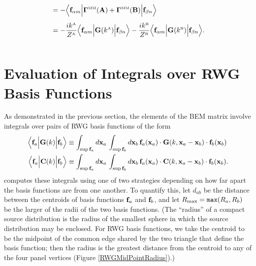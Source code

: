 \documentclass[dvips,letterpaper]{article}
\begin{document}
\begin{enumerate}
\begin{align*}
 &= -\Big\langle \mathbf{f}_{\alpha m} 
    \Big| \boldsymbol{\Gamma}^{\hbox{\tiny{MM}}}(\mathbf{A}) + \boldsymbol{\Gamma}^{\hbox{\tiny{MM}}}(\mathbf{B}) \Big|
                \mathbf{f}_{\beta n} 
    \Big\rangle
\\[5pt]
 &= -\frac{ik^{\hbox{\tiny{A}}}}{Z^{\hbox{\tiny{A}}}}
    \Big\langle \mathbf{f}_{\alpha m} 
                 \Big| \mathbf{G}(k^{\hbox{\tiny{A}}}) \Big|
                 \mathbf{f}_{\beta n} 
    \Big\rangle
    -
    \frac{ik^{\hbox{\tiny{B}}}}{Z^{\hbox{\tiny{B}}}}
    \Big\langle \mathbf{f}_{\alpha m} 
                 \Big| \mathbf{G}(k^{\hbox{\tiny{B}}}) \Big|
                 \mathbf{f}_{\beta n}
    \Big\rangle.
\\[10pt]
\end{align*}
\end{enumerate}

\newpage
\section{Evaluation of Integrals over RWG Basis Functions}

As demonstrated in the previous section, the elements of the 
BEM matrix involve integrals over pairs of RWG basis functions 
of the form
\begin{subequations}
\begin{align}
 \Big\langle \mathbf{f}_a \Big| \mathbf{G}(k) \Big | \mathbf{f}_b \Big \rangle
&\equiv 
  \int_{\sup \mathbf{f}_a} d\mathbf{x}_a \, 
  \int_{\sup \mathbf{f}_b} d\mathbf{x}_b\,
  \mathbf{f}_a(\mathbf{x}_a) \cdot 
  \mathbf{G}(k, \mathbf{x}_a-\mathbf{x}_b) \cdot 
  \mathbf{f}_b(\mathbf{x}_b)
\\
 \Big\langle \mathbf{f}_a \Big| \mathbf{C}(k) \Big | \mathbf{f}_b \Big \rangle
&\equiv 
  \int_{\sup \mathbf{f}_a} d\mathbf{x}_a \, 
  \int_{\sup \mathbf{f}_b} d\mathbf{x}_b \,
  \mathbf{f}_a(\mathbf{x}_a) \cdot 
  \mathbf{C}(k, \mathbf{x}_a-\mathbf{x}_b) \cdot 
  \mathbf{f}_b(\mathbf{x}_b).
\end{align}
\label{MatrixElementIntegrals}
\end{subequations}
\lss computes these integrals using one of two strategies depending
on how far apart the basis functions are from one another. To 
quantify this, let $d_{ab}$ be the distance between the centroids
of basis functions $\mathbf{f}_a$ and $\mathbf{f}_b$, and let 
$R_{\hbox{\scriptsize{max}}}=\texttt{max}(R_a, R_b)$ be the larger of the radii
of the two basis functions. (The ``radius'' of a compact source distribution
is the radius of the smallest sphere in which the source distribution
may be enclosed. For RWG basis functions, we take the centroid to be
the midpoint of the common edge shared by the two triangle that define
the basis function; then the radius is the greatest distance from the 
centroid to any of the four panel vertices 
(Figure \ref{RWGMidPointRadius}).) 
\end{document}
